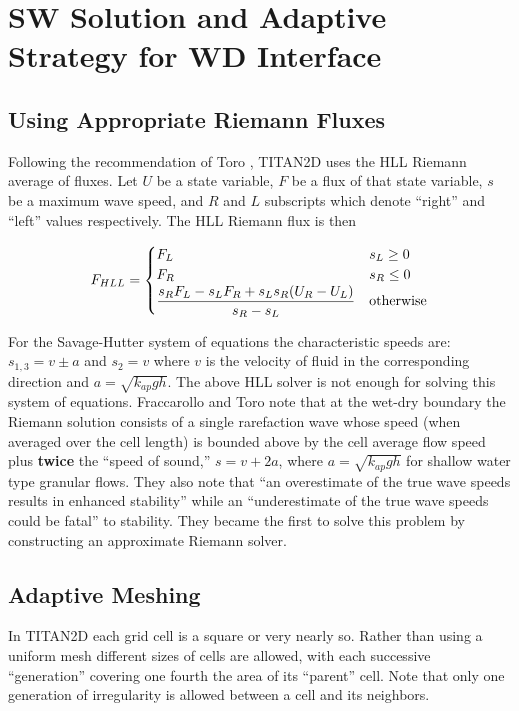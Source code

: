 \documentclass[letterpaper,10pt]{article}
\begin{document}
\section{SW Solution and Adaptive Strategy for WD Interface }

\subsection{Using Appropriate Riemann Fluxes} \label{Riemann}
Following the recommendation of Toro \cite{ToroBook2001}, TITAN2D uses 
the HLL Riemann average of fluxes. Let $U$ be a state variable, $F$ 
be a flux of that state variable, $s$ be a maximum wave speed, 
and $R$ and $L$ subscripts which denote ``right'' and ``left'' values 
respectively. The HLL Riemann flux is then

\begin{equation}
	F_{HLL}=\begin{cases}
		F_L & s_L\ge 0\\
		F_R & s_R\le 0\\
		\dfrac{s_RF_L-s_LF_R+s_Ls_R(U_R-U_L)}{s_R-s_L} & \textnormal{otherwise}
	\end{cases}
\end{equation}

For the Savage-Hutter system of equations the characteristic speeds are: $s_{1,3}=v\pm a$ and $s_2=v$ where $v$ is the 
velocity of fluid in the corresponding direction and $a=\sqrt{k_{ap}gh}$.
The above HLL solver is not enough for solving this system of equations.
Fraccarollo and Toro \cite{FraccarolloToro1995} note that at the 
wet-dry boundary the Riemann solution consists of a single rarefaction 
wave whose speed (when averaged over the cell length) 
is bounded above by the cell average flow speed plus 
{\bf twice} the ``speed of sound,'' $s=v+2a$, where $a=\sqrt{k_{ap}gh}$ 
for shallow water type granular flows.  They also note that ``an overestimate 
of the true wave speeds results in enhanced stability'' while an 
``underestimate of the true wave speeds could be fatal'' to stability.
They became the first to 
solve this problem by constructing an approximate Riemann solver.\newline

\subsection{Adaptive Meshing} \label{adaptivemeshing}
In TITAN2D each grid cell is a square or very nearly so. Rather than 
using a uniform mesh different sizes of cells are allowed, with each 
successive ``generation'' covering one fourth the area of its ``parent'' 
cell.  Note that only one generation of irregularity is allowed between 
a cell and its neighbors.\newline
\end{document}
